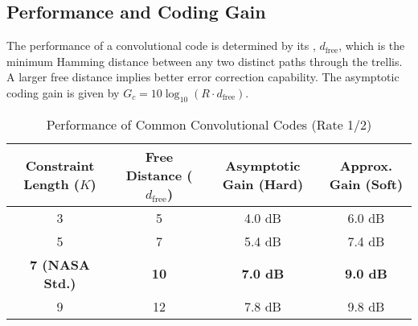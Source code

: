 \subsection{Performance and Coding Gain}

The performance of a convolutional code is determined by its , $d_{\text{free}}$, which is the minimum Hamming distance between any two distinct paths through the trellis. A larger free distance implies better error correction capability. The asymptotic coding gain is given by $G_c = 10\log_{10}(R \cdot d_{\text{free}})$.

\begin{table}[H]
    \centering
    \caption{Performance of Common Convolutional Codes (Rate 1/2)}
    \label{tab:conv-code-performance}
    \begin{tabular}{@{}cccc@{}}
        \toprule
        \tableheaderfont Constraint Length ($K$) & \tableheaderfont Free Distance ($d_{\text{free}}$) & \tableheaderfont Asymptotic Gain (Hard) & \tableheaderfont Approx. Gain (Soft) \\
        \midrule
        3 & 5 & 4.0 dB & 6.0 dB \\
        5 & 7 & 5.4 dB & 7.4 dB \\
        \textbf{7 (NASA Std.)} & \textbf{10} & \textbf{7.0 dB} & \textbf{9.0 dB} \\
        9 & 12 & 7.8 dB & 9.8 dB \\
        \bottomrule
    \end{tabular}
\end{table}


